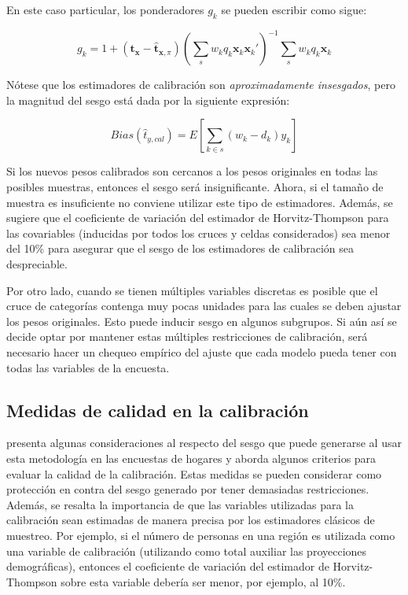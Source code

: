 \documentclass[
  12pt,
]{book}
\begin{document}
En este caso particular, los ponderadores \(g_k\) se pueden escribir como sigue:

\[
g_k = 1 + ( \mathbf{t_x} - \hat{\mathbf{t}}_{\mathbf{x}, \pi}) \left(\sum_s w_k q_k \mathbf{x}_k\mathbf{x}_k'\right)^{-1}\sum_s w_k q_k \mathbf{x}_k
\]

Nótese que los estimadores de calibración son \emph{aproximadamente insesgados}, pero la magnitud del sesgo está dada por la siguiente expresión:

\[
Bias(\hat{t}_{y, cal}) = E\left[ \sum_{k \in s} (w_k - d_k) y_k \right]
\]

Si los nuevos pesos calibrados son cercanos a los pesos originales en todas las posibles muestras, entonces el sesgo será insignificante. Ahora, si el tamaño de muestra es insuficiente no conviene utilizar este tipo de estimadores. Además, se sugiere que el coeficiente de variación del estimador de Horvitz-Thompson para las covariables (inducidas por todos los cruces y celdas considerados) sea menor del 10\% para asegurar que el sesgo de los estimadores de calibración sea despreciable.

Por otro lado, cuando se tienen múltiples variables discretas es posible que el cruce de categorías contenga muy pocas unidades para las cuales se deben ajustar los pesos originales. Esto puede inducir sesgo en algunos subgrupos. Si aún así se decide optar por mantener estas múltiples restricciones de calibración, será necesario hacer un chequeo empírico del ajuste que cada modelo pueda tener con todas las variables de la encuesta.

\hypertarget{medidas-de-calidad-en-la-calibraciuxf3n}{%
\subsection{Medidas de calidad en la calibración}\label{medidas-de-calidad-en-la-calibraciuxf3n}}

\citet{Silva_2004} presenta algunas consideraciones al respecto del sesgo que puede generarse al usar esta metodología en las encuestas de hogares y aborda algunos criterios para evaluar la calidad de la calibración. Estas medidas se pueden considerar como protección en contra del sesgo generado por tener demasiadas restricciones. Además, se resalta la importancia de que las variables utilizadas para la calibración sean estimadas de manera precisa por los estimadores clásicos de muestreo. Por ejemplo, si el número de personas en una región es utilizada como una variable de calibración (utilizando como total auxiliar las proyecciones demográficas), entonces el coeficiente de variación del estimador de Horvitz-Thompson sobre esta variable debería ser menor, por ejemplo, al 10\%.
\end{document}
